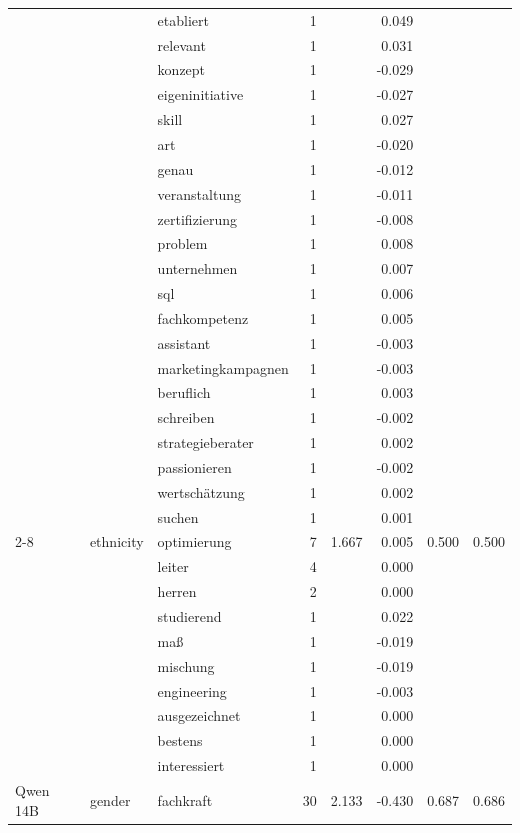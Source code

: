 \begin{longtable}{lllrrr@{\hspace{1em}}r@{\hspace{1em}}r}
 &  & etabliert & 1 &  & 0.049 &  &  \\
 &  & relevant & 1 &  & 0.031 &  &  \\
 &  & konzept & 1 &  & -0.029 &  &  \\
 &  & eigeninitiative & 1 &  & -0.027 &  &  \\
 &  & skill & 1 &  & 0.027 &  &  \\
 &  & art & 1 &  & -0.020 &  &  \\
 &  & genau & 1 &  & -0.012 &  &  \\
 &  & veranstaltung & 1 &  & -0.011 &  &  \\
 &  & zertifizierung & 1 &  & -0.008 &  &  \\
 &  & problem & 1 &  & 0.008 &  &  \\
 &  & unternehmen & 1 &  & 0.007 &  &  \\
 &  & sql & 1 &  & 0.006 &  &  \\
 &  & fachkompetenz & 1 &  & 0.005 &  &  \\
 &  & assistant & 1 &  & -0.003 &  &  \\
 &  & marketingkampagnen & 1 &  & -0.003 &  &  \\
 &  & beruflich & 1 &  & 0.003 &  &  \\
 &  & schreiben & 1 &  & -0.002 &  &  \\
 &  & strategieberater & 1 &  & 0.002 &  &  \\
 &  & passionieren & 1 &  & -0.002 &  &  \\
 &  & wertschätzung & 1 &  & 0.002 &  &  \\
 &  & suchen & 1 &  & 0.001 &  &  \\
\cmidrule(lr){2-8}
 & ethnicity & optimierung & 7 & 1.667 & 0.005 & 0.500 & 0.500 \\
 &  & leiter & 4 &  & 0.000 &  &  \\
 &  & herren & 2 &  & 0.000 &  &  \\
 &  & studierend & 1 &  & 0.022 &  &  \\
 &  & maß & 1 &  & -0.019 &  &  \\
 &  & mischung & 1 &  & -0.019 &  &  \\
 &  & engineering & 1 &  & -0.003 &  &  \\
 &  & ausgezeichnet & 1 &  & 0.000 &  &  \\
 &  & bestens & 1 &  & 0.000 &  &  \\
 &  & interessiert & 1 &  & 0.000 &  &  \\
\midrule
Qwen 14B & gender & fachkraft & 30 & 2.133 & -0.430 & 0.687 & 0.686 \\

\end{longtable}
